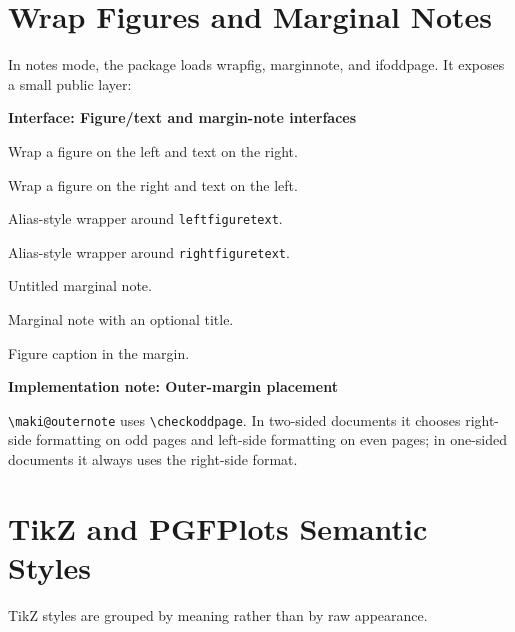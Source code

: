 \documentclass[a4paper,11pt]{ltxdoc}
\newcommand{\mpkg}[1]{\textsf{#1}}
\newcommand{\menv}[1]{\texttt{#1}}
\newcommand{\mcmd}[1]{\texttt{\textbackslash#1}}
\newenvironment{implementation}[1]
  {\par\medskip\noindent\textbf{\color{MakiBlue}Implementation note: #1}\par\smallskip}
  {\par\medskip}
\newenvironment{interfaceblock}[1]
  {\par\medskip\noindent\textbf{\color{MakiBlue}Interface: #1}\par\smallskip\begin{description}[leftmargin=3.2cm,style=nextline]}
  {\end{description}\par\medskip}
\begin{document}
\section{Wrap Figures and Marginal Notes}

In notes mode, the package loads \mpkg{wrapfig}, \mpkg{marginnote}, and
\mpkg{ifoddpage}. It exposes a small public layer:

\begin{interfaceblock}{Figure/text and margin-note interfaces}
\item[\menv{leftfiguretext}] Wrap a figure on the left and text on the right.
\item[\menv{rightfiguretext}] Wrap a figure on the right and text on the left.
\item[\menv{figuretextleft}] Alias-style wrapper around \menv{leftfiguretext}.
\item[\menv{figuretextright}] Alias-style wrapper around \menv{rightfiguretext}.
\item[\mcmd{sidenote}] Untitled marginal note.
\item[\mcmd{marginremark}] Marginal note with an optional title.
\item[\mcmd{sidecaption}] Figure caption in the margin.
\end{interfaceblock}

\begin{implementation}{Outer-margin placement}
\mcmd{maki@outernote} uses \mcmd{checkoddpage}. In two-sided documents it chooses
right-side formatting on odd pages and left-side formatting on even pages; in
one-sided documents it always uses the right-side format.
\end{implementation}

\section{TikZ and PGFPlots Semantic Styles}

TikZ styles are grouped by meaning rather than by raw appearance.
\end{document}
